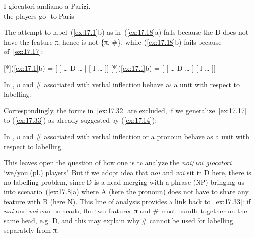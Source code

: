 \documentclass[output=paper]{langsci/langscibook}
\begin{document}
\begin{exe}
    \gll I giocatori andiamo a Parigi.\\
    the players go-\Fpl{} to Paris\\
    \glt
\end{exe}
The attempt to label~(\ref{ex:17.1}b) as in~(\ref{ex:17.18}a) fails
because the D does not have the feature π, hence is not \{π, \#\},
while~(\ref{ex:17.18}b) fails because of~\eqref{ex:17.17}:

\begin{exe}
\exi{\eqref{ex:17.18}}
\begin{xlist}
    [*]{(\ref{ex:17.1}b) = [\tss{\{} [ \dots{} D\tss{\#} \dots{} ] [ I\tss{\{}\tss{,\#\}} \dots{} ]]}
    [*]{(\ref{ex:17.1}b)  = [ [ \dots{} D\tss{\#} \dots{} ] [ I\tss{\{}\tss{,\#\}} \dots{} ]]}
\end{xlist}
\end{exe}

\begin{exe}
\exi{\eqref{ex:17.17}}
    In , π and \# associated with verbal inflection behave as a unit
    with respect to labelling.
\end{exe}
Correspondingly, the forms in~\eqref{ex:17.32} are excluded, if we
generalize~\eqref{ex:17.17} to (\ref{ex:17.33}) as already suggested by
(\ref{ex:17.14}):

\ea\label{ex:17.33}
    In , π and \# associated with verbal inflection or a pronoun behave
    as a unit with respect to labelling.
\z

\ea\label{ex:17.34}
    \z
\z
This leaves open the question of how one is to analyze the 
\emph{noi}/\emph{voi giocatori} ‘we/you (pl.) players’. But if we adopt
 idea that \emph{noi} and \emph{voi} sit in D here, there is
no labelling problem, since D is a head merging with a phrase
(NP) bringing us into scenario~(\ref{ex:17.8}a) where A (here the pronoun)
does not have to share any feature with B (here N). This line of analysis
provides a link back to~\eqref{ex:17.33}: if \emph{noi} and \emph{voi} can
be heads, the two features π and \# must bundle together on the same head, e.g.
D, and this may explain why \# cannot be used for labelling
separately from π.
\end{document}
